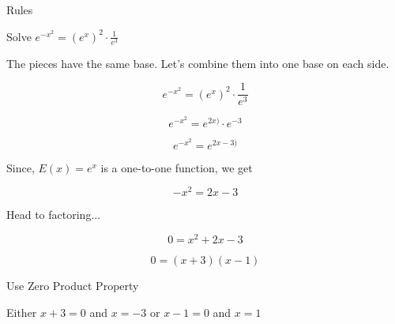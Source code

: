 \documentclass{ximera}
\begin{document}
\begin{example} Rules



Solve $e^{- x^2} = \left(e^x\right)^2 \cdot \frac{1}{e^3}$


The pieces have the same base.  Let's combine them into one base on each side.



\[  e^{- x^2} = \left(e^x\right)^2 \cdot \frac{1}{e^3}     \]

\[  e^{- x^2}  = e^{2x)} \cdot e^{-3} \]

\[  e^{- x^2}  = e^{2x-3)}  \]



Since, $E(x) = e^x$ is a one-to-one function, we get


\[  -x^2 = 2x - 3  \]


Head to factoring...


\[  0 = x^2 + 2x - 3  \]


\[  0 =(x+3)(x-1) \]


Use Zero Product Property



Either  $x+3 = 0$ and $x = -3$  or $x-1=0$ and $x = 1$



\end{example}
\end{document}
